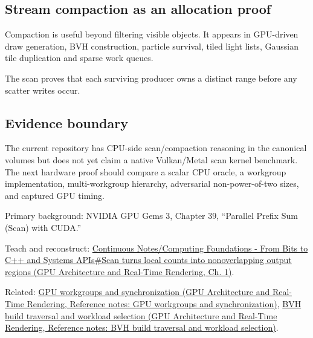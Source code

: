 \subsection{Stream compaction as an allocation proof}\label{appendix-f2ee4d086415-stream-compaction-as-an-allocation-proof}

Compaction is useful beyond filtering visible objects. It appears in GPU-driven draw generation, BVH construction, particle survival, tiled light lists, Gaussian tile duplication and sparse work queues.

The scan proves that each surviving producer owns a distinct range before any scatter writes occur.

\subsection{Evidence boundary}\label{appendix-f2ee4d086415-evidence-boundary}

The current repository has CPU-side scan/compaction reasoning in the canonical volumes but does not yet claim a native Vulkan/Metal scan kernel benchmark. The next hardware proof should compare a scalar CPU oracle, a workgroup implementation, multi-workgroup hierarchy, adversarial non-power-of-two sizes, and captured GPU timing.

Primary background: NVIDIA GPU Gems 3, Chapter 39, ``Parallel Prefix Sum (Scan) with CUDA.''

Teach and reconstruct: \href{../06-GPU-Architecture-and-Real-Time-Rendering/main.pdf\#nameddest=01-foundations-i-ch008-scan-turns-local-counts-into-nonoverlapping-output-regions}{Continuous Notes/Computing Foundations - From Bits to C++ and Systems APIs\#Scan turns local counts into nonoverlapping output regions (GPU Architecture and Real-Time Rendering, Ch. 1)}.

Related: \href{../06-GPU-Architecture-and-Real-Time-Rendering/main.pdf\#nameddest=appendix-f662b5b1773b}{GPU workgroups and synchronization (GPU Architecture and Real-Time Rendering, Reference notes: GPU workgroups and synchronization)}, \href{../06-GPU-Architecture-and-Real-Time-Rendering/main.pdf\#nameddest=appendix-5653a7aea6bb}{BVH build traversal and workload selection (GPU Architecture and Real-Time Rendering, Reference notes: BVH build traversal and workload selection)}.

